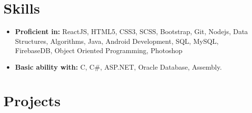 \documentclass[11pt,a4paper,sans]{moderncv}        %
\begin{document}
\section{Skills}
\vspace{6pt}
\begin{itemize}
\item \textbf{Proficient in:} ReactJS, HTML5, CSS3, SCSS, Bootstrap, Git, Nodejs, Data Structures, Algorithms, Java, Android Development, SQL, MySQL, FirebaseDB, Object Oriented Programming, Photoshop\vspace{4pt}
\item \textbf{Basic ability with:} C, C\#, ASP.NET, Oracle Database, Assembly.

\vspace{6pt}
\end{itemize} 		


\section{Projects}
\vspace{6pt}
\end{document}
